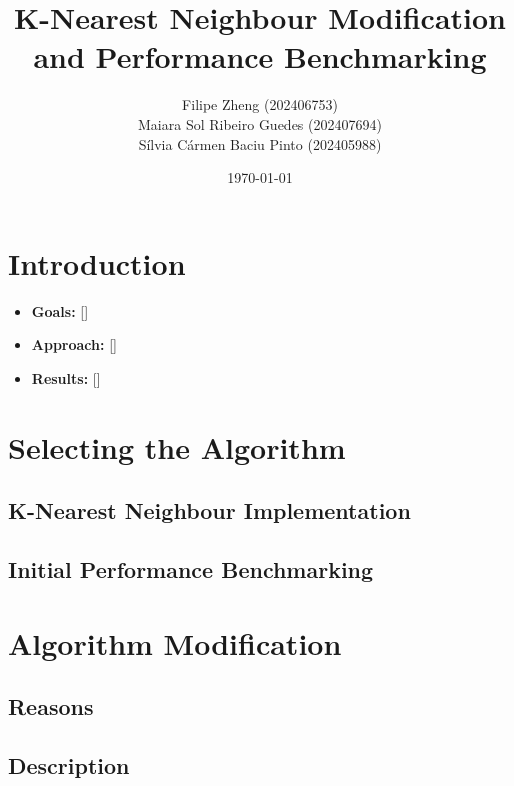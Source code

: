 \documentclass[12pt,a4paper]{article}
\title{K-Nearest Neighbour Modification and Performance Benchmarking}
\author{
    Filipe Zheng (202406753) \\
    Maiara Sol Ribeiro Guedes (202407694) \\
    Sílvia Cármen Baciu Pinto (202405988)
}
\date{\today}
\begin{document}
\maketitle
\newpage

\section*{Introduction}
\begin{itemize}
    \item \textbf{Goals:} []
    \item \textbf{Approach:} []
    \item \textbf{Results:} []
\end{itemize}
\newpage

\tableofcontents
\newpage

\section{Selecting the Algorithm}
\subsection{K-Nearest Neighbour Implementation}

\subsection{Initial Performance Benchmarking}

\section{Algorithm Modification}
\subsection{Reasons}

\subsection{Description}
\end{document}

